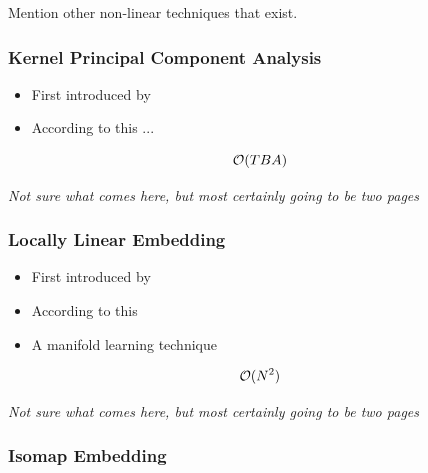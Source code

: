 Mention other non-linear techniques that exist.





\subsubsection{Kernel Principal Component Analysis}

\begin{itemize}
	\item First introduced by \cite{scholkopf1998nonlinear}
	\item According to this ...%
\end{itemize}

$$\mathcal{O}(TBA)$$

\clearpage

\begin{center}
	\textit{Not sure what comes here, but most certainly going to be two pages}
\end{center}

\clearpage







\subsubsection{Locally Linear Embedding}

\begin{itemize}
	\item First introduced by \cite{roweis2000nonlinear}
	\item According to this \cite{DRUnsupervisedNearestNeighbors}
	\item A manifold learning technique \cite{HandsOnMLCh8}
\end{itemize}

$$\mathcal{O}(N^2)$$

\clearpage

\begin{center}
	\textit{Not sure what comes here, but most certainly going to be two pages}
\end{center}

\clearpage




\subsubsection{Isomap Embedding}

